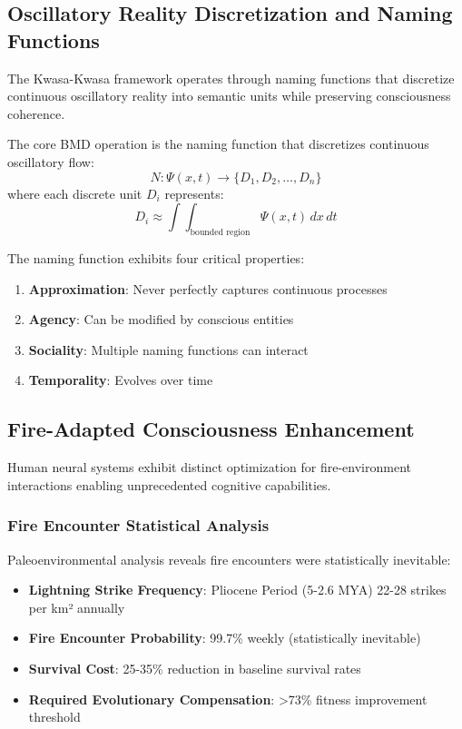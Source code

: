 ﻿\documentclass[11pt,a4paper]{article}
\begin{document}
\subsection{Oscillatory Reality Discretization and Naming Functions}

The Kwasa-Kwasa framework operates through naming functions that discretize continuous oscillatory reality into semantic units while preserving consciousness coherence.

\begin{definition}
The core BMD operation is the naming function that discretizes continuous oscillatory flow:
\begin{equation}
N: \Psi(x,t) \rightarrow \{D_1, D_2, \ldots, D_n\}
\end{equation}
where each discrete unit $D_i$ represents:
\begin{equation}
D_i \approx \int\int_{\text{bounded region}} \Psi(x,t) \, dx \, dt
\end{equation}
\end{definition}

The naming function exhibits four critical properties:
\begin{enumerate}
\item \textbf{Approximation}: Never perfectly captures continuous processes
\item \textbf{Agency}: Can be modified by conscious entities
\item \textbf{Sociality}: Multiple naming functions can interact
\item \textbf{Temporality}: Evolves over time
\end{enumerate}

\subsection{Fire-Adapted Consciousness Enhancement}

Human neural systems exhibit distinct optimization for fire-environment interactions enabling unprecedented cognitive capabilities.

\subsubsection{Fire Encounter Statistical Analysis}

Paleoenvironmental analysis reveals fire encounters were statistically inevitable:
\begin{itemize}
\item \textbf{Lightning Strike Frequency}: Pliocene Period (5-2.6 MYA) 22-28 strikes per km² annually
\item \textbf{Fire Encounter Probability}: 99.7\% weekly (statistically inevitable)
\item \textbf{Survival Cost}: 25-35\% reduction in baseline survival rates
\item \textbf{Required Evolutionary Compensation}: >73\% fitness improvement threshold
\end{itemize}
\end{document}
